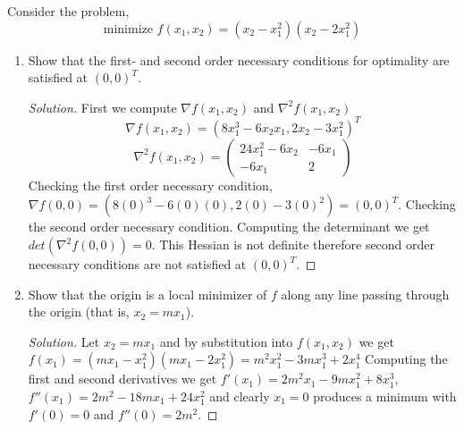 \documentclass[12pt]{article}
\makeatletter
\theoremstyle{homework}
\newenvironment{exercise}[1]
{\def\@currentlabel{#1}\exercisecore}
{\endexercisecore}
\makeatother
\begin{document}
\begin{exercise}{2.7} Consider the problem, 
  \begin{equation*}
    \text{minimize } f(x_1, x_2) = (x_2 - x_1^2)(x_2 - 2x_1^2)
  \end{equation*}
  \begin{enumerate}
    \item[(i)] Show that the first- and second order necessary conditions for optimality are satisfied at $(0,0)^T$. 
    \begin{proof}[Solution] First we compute $\nabla f(x_1, x_2)$ and $\nabla^2 f(x_1, x_2)$ 
      \begin{equation*}
        \nabla f(x_1, x_2) = (8x_1^3-6x_2x_1 ,2x_2-3x_1^2)^T
      \end{equation*}
      \begin{equation*}
        \nabla^2 f(x_1, x_2) = 
        \begin{pmatrix}
          24x_1^2-6x_2 & -6x_1\\
          -6x_1 & 2
        \end{pmatrix}
      \end{equation*}
      Checking the first order necessary condition, $\nabla f(0, 0) = (8(0)^3-6(0)(0) ,2(0)-3(0)^2) = (0, 0)^T$. 
      Checking the second order necessary condition. Computing the determinant we get $det(\nabla^2 f(0, 0)) = 0$. 
      This Hessian is not definite therefore second order necessary conditions are not satisfied at $(0,0)^T$.
    \end{proof}
    \vspace{.15in}

    \item[(ii)] Show that the origin is a local minimizer of $f$ along any line passing through the origin (that is, $x_2 = mx_1$). 
    \begin{proof}[Solution] Let $x_2 = mx_1$ and by substitution into $f(x_1, x_2)$ we get $f(x_1) = (mx_1 - x_1^2)(mx_1 - 2x_1^2) = m^2x_1^2-3mx_1^3+2x_1^4$
      Computing the first and second derivatives we get $f'(x_1) = 2m^2x_1-9mx_1^2+8x_1^3$, $f''(x_1) = 2m^2-18mx_1+24x_1^2$ and clearly $x_1 = 0$ produces a minimum
      with $f'(0) = 0$ and $f''(0) = 2m^2$. 
      \end{proof}
    


\end{enumerate}
\end{exercise}
\end{document}
